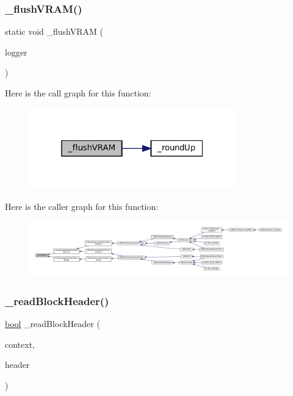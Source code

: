 \subsubsection{\texorpdfstring{\+\_\+flush\+V\+R\+A\+M()}{\_flushVRAM()}}
{\footnotesize\ttfamily static void \+\_\+flush\+V\+R\+AM (\begin{DoxyParamCaption}\item[{struct m\+Video\+Logger $\ast$}]{logger }\end{DoxyParamCaption})\hspace{0.3cm}{\ttfamily [static]}}

Here is the call graph for this function\+:
\nopagebreak
\begin{figure}[H]
\begin{center}
\leavevmode
\includegraphics[width=253pt]{video-logger_8c_af04fe8e7da4383d4c2de8bd267880974_cgraph}
\end{center}
\end{figure}
Here is the caller graph for this function\+:
\nopagebreak
\begin{figure}[H]
\begin{center}
\leavevmode
\includegraphics[width=350pt]{video-logger_8c_af04fe8e7da4383d4c2de8bd267880974_icgraph}
\end{center}
\end{figure}
\mbox{\label{video-logger_8c_abb929a40c45d70202af57598a73f625a}} 
\subsubsection{\texorpdfstring{\+\_\+read\+Block\+Header()}{\_readBlockHeader()}}
{\footnotesize\ttfamily \mbox{\hyperlink{libretro_8h_a4a26dcae73fb7e1528214a068aca317e}{bool}} \+\_\+read\+Block\+Header (\begin{DoxyParamCaption}\item[{struct m\+Video\+Log\+Context $\ast$}]{context,  }\item[{struct m\+V\+L\+Block\+Header $\ast$}]{header }\end{DoxyParamCaption})}

